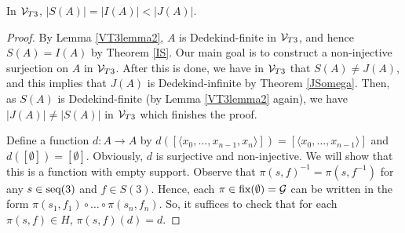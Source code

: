 \begin{theorem}\label{VT3result}
In $\mathcal{V}_{T3}$, $|S(A)|=|I(A)|<|J(A)|$.
\end{theorem}

\begin{proof}
By Lemma \ref{VT3lemma2}, $A$ is Dedekind-finite in $\mathcal{V}_{T3}$, and hence $S(A)=I(A)$ by Theorem \ref{IS}. Our main goal is to construct a non-injective surjection on $A$ in $\mathcal{V}_{T3}$. After this is done, we have in $\mathcal{V}_{T3}$ that $S(A) \neq J(A)$, and this implies that $J(A)$ is Dedekind-infinite by Theorem \ref{JSomega}. Then, as $S(A)$ is Dedekind-finite (by Lemma \ref{VT3lemma2} again), we have $|J(A)| \neq |S(A)|$ in $\mathcal{V}_{T3}$ which finishes the proof.

Define a function $d:A\to A$ by $d([\langle x_{0},\dotsc,x_{n-1}, x_{n}\rangle])= [\langle x_{0},\dotsc, x_{n-1}\rangle]$ and $d([\emptyset])=[\emptyset]$. Obviously, $d$ is surjective and non-injective. We will show that this is a function with empty support. Observe that $\pi(s,f)^{-1}=\pi(s,f^{-1})$ for any $s\in\textup{seq}(3)$ and $f\in S(3)$. Hence, each $\pi\in \textup{fix}(\emptyset)=\mathcal{G}$ can be written in the form $\pi(s_{1},f_{1})\circ\dotsc\circ\pi(s_{n},f_{n})$. So, it suffices to check that for each $\pi(s,f)\in H$, $\pi(s,f)(d)=d$.


\end{proof}
